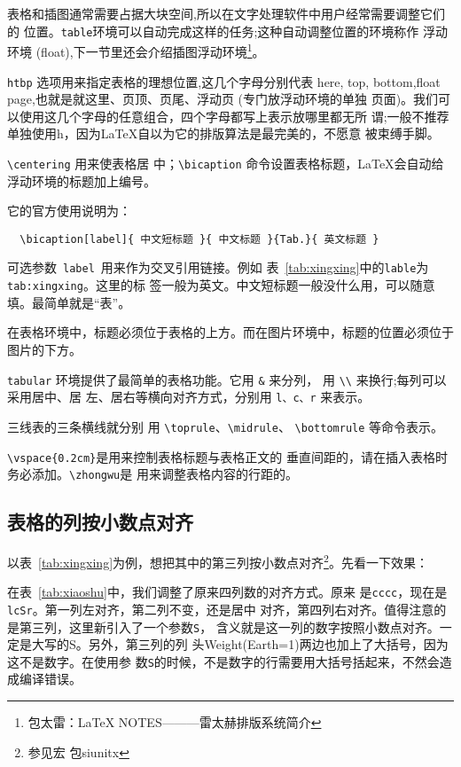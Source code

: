 表格和插图通常需要占据大块空间,所以在文字处理软件中用户经常需要调整它们的
位置。\texttt{table}环境可以自动完成这样的任务;这种自动调整位置的环境称作
浮动环境 (float),下一节里还会介绍插图浮动环境\footnote{包太雷：\LaTeX{}
  NOTES———雷太赫排版系统简介}。

\texttt{htbp} 选项用来指定表格的理想位置,这几个字母分别代表 here, top,
bottom,float page,也就是就这里、页顶、页尾、浮动页 (专门放浮动环境的单独
页面)。我们可以使用这几个字母的任意组合，四个字母都写上表示放哪里都无所
谓;一般不推荐单独使用h，因为\LaTeX{}自以为它的排版算法是最完美的，不愿意
被束缚手脚。

\texttt{\textbackslash{centering}} 用来使表格居
中；\texttt{\textbackslash{bicaption}} 命令设置表格标题，\LaTeX{}会自动给
浮动环境的标题加上编号。

它的官方使用说明为：
\begin{lstlisting}
  \bicaption[label]{ 中文短标题 }{ 中文标题 }{Tab.}{ 英文标题 }
\end{lstlisting}
可选参数~\texttt{\footnotesize label}~用来作为交叉引用链接。例如
表~\ref{tab:xingxing}中的\texttt{lable}为\texttt{tab:xingxing}。这里的标
签一般为英文。中文短标题一般没什么用，可以随意填。最简单就是“表”。

在表格环境中，标题必须位于表格的上方。而在图片环境中，标题的位置必须位于
图片的下方。

\texttt{tabular} 环境提供了最简单的表格功能。它用 \texttt{\&} 来分列，
用 \texttt{\textbackslash{\textbackslash{}}} 来换行;每列可以采用居中、居
左、居右等横向对齐方式，分别用 \texttt{l、c、r} 来表示。

三线表的三条横线就分别
用 \texttt{\textbackslash{toprule}}、\texttt{\textbackslash{midrule}}、
\texttt{\textbackslash{bottomrule}} 等命令表示。

\texttt{\textbackslash{vspace}\{0.2cm\}}是用来控制表格标题与表格正文的
垂直间距的，请在插入表格时务必添加。\texttt{\textbackslash{zhongwu}}是
用来调整表格内容的行距的。


\subsection{表格的列按小数点对齐}

以表~\ref{tab:xingxing}为例，想把其中的第三列按小数点对齐\footnote{参见宏
  包siunitx}。先看一下效果：

在表~\ref{tab:xiaoshu}中，我们调整了原来四列数的对齐方式。原来
是\texttt{cccc}，现在是\texttt{lcSr}。第一列左对齐，第二列不变，还是居中
对齐，第四列右对齐。值得注意的是第三列，这里新引入了一个参数\texttt{S}，
含义就是这一列的数字按照小数点对齐。一定是大写的S。另外，第三列的列
头Weight(Earth=1)两边也加上了大括号，因为这不是数字。在使用参
数\texttt{S}的时候，不是数字的行需要用大括号括起来，不然会造成编译错误。

